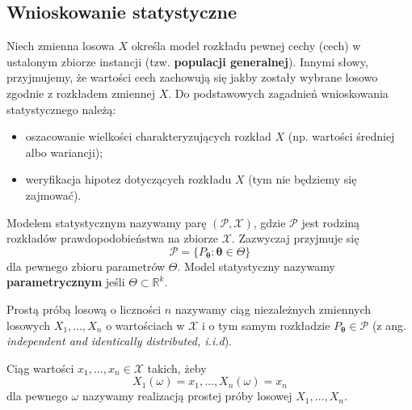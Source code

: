 \documentclass{myclass}
\numberwithin{equation}{subsection}
\begin{document}
\subsection{Wnioskowanie statystyczne}

Niech zmienna losowa \(X\) określa model rozkładu pewnej cechy (cech) w ustalonym zbiorze instancji
(tzw. \textbf{populacji generalnej}). Innymi słowy, przyjmujemy, że wartości cech zachowują się
jakby zostały wybrane losowo zgodnie z rozkładem zmiennej \(X\). Do podstawowych zagadnień
wnioskowania statystycznego należą:
\begin{itemize}

    \item oszacowanie wielkości charakteryzujących rozkład \(X\) (np. wartości średniej albo
    wariancji);

    \item weryfikacja hipotez dotyczących rozkładu \(X\) (tym nie będziemy się zajmować).
    
\end{itemize}

\begin{definition}
Modelem statystycznym nazywamy parę \((\mathcal{P}, \mathcal{X})\), gdzie \(\mathcal{P}\) jest
rodziną rozkładów prawdopodobieństwa na zbiorze \(\mathcal{X}\). Zazwyczaj przyjmuje się
\begin{equation*}
    \mathcal{P} = \{P_{\boldsymbol{\theta}} : \boldsymbol{\theta} \in \Theta \} 
\end{equation*}
dla pewnego zbioru parametrów \(\Theta\). Model statystyczny nazywamy \textbf{parametrycznym} jeśli
\(\Theta \subset \mathbb{R}^k\).
\end{definition}

\begin{definition}
Prostą próbą losową o liczności \(n\) nazywamy ciąg niezależnych zmiennych losowych
\(X_1,\ldots,X_n\) o wartościach w \(\mathcal{X}\) i o tym samym rozkładzie
\(P_{\boldsymbol{\theta}} \in \mathcal{P}\) (z ang. \textit{independent and identically distributed,
i.i.d}).
\end{definition}

\begin{definition}
Ciąg wartości \(x_1,\ldots,x_n \in \mathcal{X}\) takich, żeby
\begin{equation*}
    X_1(\omega) = x_1,\ldots,X_n(\omega) = x_n
\end{equation*}
dla pewnego \(\omega\) nazywamy realizacją prostej próby losowej \(X_1,\ldots,X_n\).
\end{definition}
\end{document}
